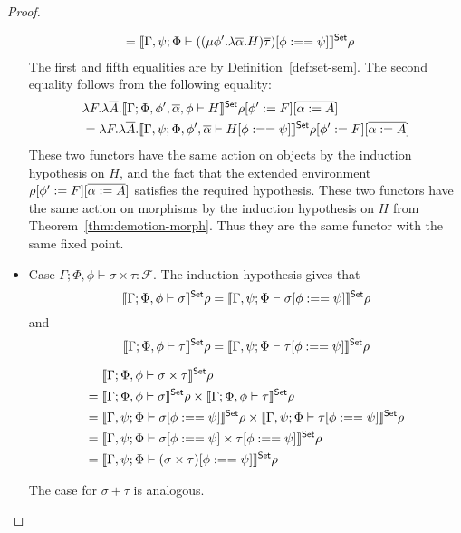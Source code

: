 \documentclass[acmsmall,review,anonymous]{acmart}
\theoremstyle{definition}
\newcommand{\F}{\mathcal{F}}
\begin{document}
\begin{proof}
\begin{itemize}
\begin{align*}
        = \; & \llbracket{\Gamma, \psi; \Phi \vdash ((\mu \phi'. \lambda \overline{\alpha}. H) \overline{\tau})[\phi :== \psi] }\rrbracket^{\mathsf{Set}} \rho 
      \end{align*} 
      The first and fifth equalities are by Definition~\ref{def:set-sem}.
      The second equality follows from the following equality:
      \begin{align*}
        &\lambda F. \lambda \overline{A}. \llbracket{\Gamma; \Phi, \phi', \overline{\alpha}, \phi \vdash H}\rrbracket^{\mathsf{Set}} \rho[\phi' := F][\overline{\alpha := A}] \\
        & = \lambda F. \lambda \overline{A}. \llbracket{\Gamma, \psi; \Phi, \phi', \overline{\alpha} \vdash H[\phi :== \psi]}\rrbracket^{\mathsf{Set}} \rho[\phi' := F][\overline{\alpha := A}]
      \end{align*}
      These two functors have the same action on objects by the induction hypothesis on $H$, and the fact
      that the extended environment $\rho[\phi' := F][\overline{\alpha := A}]$ satisfies the required
      hypothesis. These two functors have the same action on morphisms by the induction hypothesis
      on $H$ from Theorem~\ref{thm:demotion-morph}. Thus they are the same functor with the same fixed point.

  \item Case $\Gamma; \Phi, \phi \vdash \sigma \times \tau : \F$. The induction hypothesis gives that 
      $$\llbracket{\Gamma; \Phi, \phi \vdash \sigma }\rrbracket^{\mathsf{Set}} \rho
        = \llbracket{\Gamma, \psi; \Phi \vdash \sigma[\phi :== \psi] }\rrbracket^{\mathsf{Set}} \rho$$ 
        and
      $$\llbracket{\Gamma; \Phi, \phi \vdash \tau }\rrbracket^{\mathsf{Set}} \rho
        = \llbracket{\Gamma, \psi; \Phi \vdash \tau[\phi :== \psi] }\rrbracket^{\mathsf{Set}} \rho$$ 

    \begin{align*}
           & \llbracket{\Gamma; \Phi, \phi \vdash \sigma \times \tau}\rrbracket^{\mathsf{Set}} \rho \\
      = \; & \llbracket{\Gamma; \Phi, \phi \vdash \sigma}\rrbracket^{\mathsf{Set}} \rho \times \llbracket{\Gamma; \Phi, \phi \vdash \tau}\rrbracket^{\mathsf{Set}} \rho\\
      = \; & \llbracket{\Gamma, \psi; \Phi \vdash \sigma[\phi :== \psi]}\rrbracket^{\mathsf{Set}} \rho \times \llbracket{\Gamma, \psi; \Phi \vdash \tau[\phi :== \psi]}\rrbracket^{\mathsf{Set}} \rho\\
      = \; & \llbracket{\Gamma, \psi; \Phi \vdash \sigma[\phi :==\psi] \times \tau[\phi :== \psi]}\rrbracket^{\mathsf{Set}} \rho \\
      = \; & \llbracket{\Gamma, \psi; \Phi \vdash (\sigma \times \tau)[\phi :== \psi]}\rrbracket^{\mathsf{Set}} \rho
    \end{align*}

    The case for $\sigma + \tau$ is analogous.
\end{itemize}
\end{proof}
\end{document}
